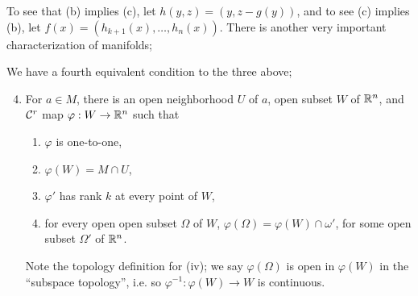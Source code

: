 \noindent To see that (b) implies (c), let $h(y, z) = (y, z - g(y))$, and to see (c) implies (b), let $f(x) = (h_{k+1}(x), \dots, h_n(x))$.
\medskip\newline
There is another very important characterization of manifolds;
\begin{simplethm}
    We have a fourth equivalent condition to the three above;
    \begin{enumerate}[label=(\alph*)]
        \setcounter{enumi}{3}
        \item For $a \in M$, there is an open neighborhood $U$ of $a$, open subset $W$ of $\mathbb R^n$, and $\mathcal C^r$ map $\varphi : W \to \mathbb R^n$ such that
        \begin{enumerate}[label=(\roman*)]
            \item $\varphi$ is one-to-one,
            \item $\varphi(W) = M \cap U$,
            \item $\varphi'$ has rank $k$ at every point of $W$,
            \item for every open open subset $\Omega$ of $W$, $\varphi(\Omega) = \varphi(W) \cap \omega'$, for some open subset $\Omega'$ of $\mathbb R^n$.
        \end{enumerate}
        Note the topology definition for (iv); we say $\varphi(\Omega)$ is open in $\varphi(W)$ in the ``subspace topology'', i.e. so $\varphi^{-1} : \varphi(W) \to W$ is continuous.
    \end{enumerate}
\end{simplethm}
